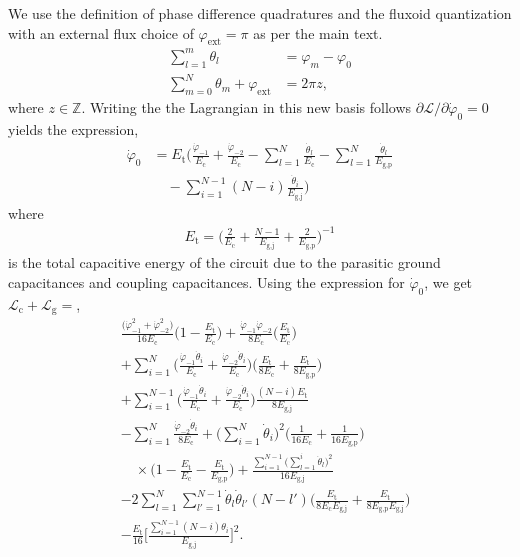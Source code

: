 \documentclass[%
reprint,
superscriptaddress,
 amsmath,amssymb,
 aps,
 prx,
longbibliography,
floatfix,
]{revtex4-2}
\begin{document}
We use the definition of phase difference quadratures and the fluxoid quantization with an external flux choice of $\varphi_{\mathrm{ext}}=\pi$ as per the main text.
\begin{align}
\sum_{l=1}^m\theta_l&=\varphi_m-\varphi_0\\
\sum_{m=0}^N \theta_m+\varphi_\mathrm{ext}&=2\pi z,
\end{align}
where $z\in\mathbb{Z}$. Writing the the Lagrangian in this new basis follows $\partial \mathcal{L}/\partial \dot{\varphi}_0=0$ yields the expression,
\begin{align}
\dot{\varphi}_0&=E_{\textrm{t}}\Big(\frac{\dot{\varphi}_{-1}}{E_{\textrm{c}}}+\frac{\dot{\varphi}_{-2}}{E_{\textrm{c}}}-\sum_{l=1}^{N}\frac{\dot{\theta}_l}{E_{\textrm{c}}}-\sum_{l=1}^{N}\frac{\dot{\theta}_l}{E_{\textrm{g,p}}}\nonumber\\&\quad-\sum_{i=1}^{N-1}(N-i)\frac{\dot{\theta}_i}{E_{\textrm{g,j}}}\Big)
\end{align}
where
\begin{align}
E_\textrm{t}=\Big(\frac{2}{E_{\textrm{c}}}+\frac{N-1}{E_{\textrm{g,j}}}+\frac{2}{E_{\textrm{g,p}}}\Big)^{-1}\label{eq:tot_cap}
\end{align}
is the total capacitive energy of the circuit due to the parasitic ground capacitances and coupling capacitances. Using the expression for $\dot{\varphi}_0$, we get $\mathcal{L}_\textrm{c}+\mathcal{L}_\textrm{g}=$,
\begin{align}
&\frac{\big(\dot{\varphi}^2_{-1}+\dot{\varphi}^2_{-2}\big)}{16E_\textrm{c}}\Big(1-\frac{E_\textrm{t}}{E_\textrm{c}}\Big)+\frac{\dot{\varphi}_{-1}\dot{\varphi}_{-2}}{8E_\textrm{c}}\Big(\frac{E_\textrm{t}}{E_\textrm{c}}\Big)\nonumber\\
&+\sum_{i=1}^N\Big(\frac{\dot{\varphi}_{-1}\dot{\theta}_i}{E_\textrm{c}}+\frac{\dot{\varphi}_{-2}\dot{\theta}_i}{E_\textrm{c}}\Big)\Big(\frac{E_\textrm{t}}{8E_\textrm{c}}+\frac{E_\textrm{t}}{8E_\textrm{g,p}}\Big)\nonumber\\&+\sum_{i=1}^{N-1}\Big(\frac{\dot{\varphi}_{-1}\dot{\theta}_i}{E_\textrm{c}}+\frac{\dot{\varphi}_{-2}\dot{\theta}_i}{E_\textrm{c}}\Big)\frac{(N-i)E_\textrm{t}}{8E_\textrm{g,j}}\nonumber\\
&-\sum_{i=1}^N\frac{\dot{\varphi}_{-2}\dot{\theta}_i}{8E_\textrm{c}}+\Big(\sum_{i=1}^N\dot{\theta}_i\Big)^2\Bigg(\frac{1}{16E_\textrm{c}}+\frac{1}{16E_\textrm{g,p}}\Bigg)\nonumber\\&\quad\times\Bigg(1-\frac{E_\textrm{t}}{E_\textrm{c}}-\frac{E_\textrm{t}}{E_\textrm{g,p}}\Bigg)+\frac{\sum_{i=1}^{N-1}\big(\sum_{l=1}^i\dot{\theta}_l\big)^2}{16E_\textrm{g,j}}\nonumber\\
&-2\sum_{l=1}^N \sum_{l'=1}^{N-1}\dot{\theta}_l\dot{\theta}_{l'}(N-l')\Bigg(\frac{E_\textrm{t}}{8E_\textrm{c}E_\textrm{g,j}}+\frac{E_\textrm{t}}{8E_\textrm{g,p}E_\textrm{g,j}}\Bigg)\nonumber\\
&-\frac{E_\textrm{t}}{16}\Bigg[\frac{\sum_{i=1}^{N-1}(N-i)\theta_i}{E_\textrm{g,j}}\Bigg]^2.
\end{align}
\end{document}

